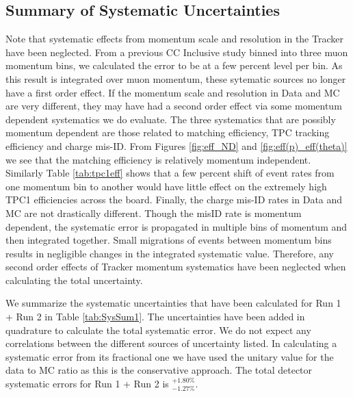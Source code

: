 \subsection{Summary of Systematic Uncertainties}
\label{sec:Systematics_Summary}

{\color{red} Note that systematic effects from momentum scale and resolution in the Tracker have been neglected. From a previous CC Inclusive study binned into three muon momentum bins, we calculated the error to be at a few percent level per bin. As this result is integrated over muon momentum, these sytematic sources no longer have a first order effect. If the momentum scale and resolution in Data and MC are very different, they may have had a second order effect via some momentum dependent systematics we do evaluate. The three systematics that are possibly momentum dependent are those related to matching efficiency, TPC tracking efficiency and charge mis-ID. From Figures \ref{fig:eff_ND} and \ref{fig:eff(p)_eff(theta)} we see that the matching efficiency is relatively momentum independent. Similarly Table \ref{tab:tpc1eff} shows that a few percent shift of event rates from one momentum bin to another would have little effect on the extremely high TPC1 efficiencies across the board. Finally, the charge mis-ID rates in Data and MC are not drastically different. Though the misID rate is momentum dependent, the systematic error is propagated in multiple bins of momentum and then integrated together. Small migrations of events between momentum bins results in negligible changes in the integrated systematic value. Therefore, any second order effects of Tracker momentum systematics have been neglected when calculating the total uncertainty.}

We summarize the systematic uncertainties that have been calculated 
for Run 1 + Run 2 in Table \ref{tab:SysSum1}. The uncertainties have been added in quadrature to calculate the total systematic error. We do not expect any correlations between the different sources of uncertainty listed. In calculating a systematic error from its fractional one 
we have used the unitary value for the data to MC ratio as 
this is the conservative approach. 
The total detector systematic errors 
for Run 1 + Run 2 is $^{+1.80\%}_{-1.27\%}$.

